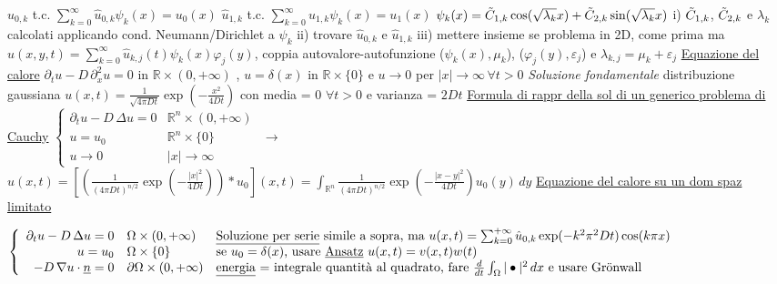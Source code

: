 \documentclass{article}
\begin{document}
\quad $\hat{u}_{0,k}$ t.c. $\sum_{k=0}^\infty \hat{u}_{0,k}\psi_k(x)=u_0(x)$
\quad $\hat{u}_{1,k}$ t.c. $\sum_{k=0}^\infty \hat{u}_{1,k}\psi_k(x)=u_1(x)$
\quad $\psi_k(x)=\Tilde{C}_{1,k}\cos (\sqrt{\lambda_k}x)+\Tilde{C}_{2,k}\sin (\sqrt{\lambda_k}x)$
\quad i) $\Tilde{C}_{1,k}$, $\Tilde{C}_{2,k}$ e $\lambda_k$ calcolati applicando cond. Neumann/Dirichlet a $\psi_k$ 
ii) trovare $\hat{u}_{0,k}$ e $\hat{u}_{1,k}$ iii) mettere insieme
\quad se problema in 2D, come prima ma $u(x,y,t)=\sum_{k=0}^\infty \hat{u}_{k,j}(t)\psi_k(x)\varphi_j(y)$, coppia autovalore-autofunzione ($\psi_k(x),\mu_k$), ($\varphi_j(y),\varepsilon_j$) e $\lambda_{k,j}=\mu_k+\varepsilon_j$
\underline{Equazione del calore}
$\partial_tu-D\,\partial_x^2u=0$ in $\mathbb{R}\times (0,+\infty)$ , $u = \delta(x)$ in $\mathbb{R}\times \{ 0 \}$ e $u \rightarrow 0$ per $|x| \rightarrow \infty \, \forall t>0$
\textit{Soluzione fondamentale} distribuzione gaussiana $u(x,t)=\frac{1}{\sqrt{4 \pi Dt}}\exp{(-\frac{x^2}{4Dt})}$ con media = 0 $\forall t>0$ e varianza = $2Dt$
\underline{Formula di rappr della sol di un generico problema di Cauchy}
$\left\{ \begin{array}{rl}
\partial_tu-D\,\Delta u=0 & \mathbb{R}^n \times (0,+\infty) \\
u=u_0 & \mathbb{R}^n \times \{ 0 \} \\
u \rightarrow 0 & |x|\rightarrow \infty
\end{array}\right.$ $\rightarrow$
$u(x,t) = [(\frac{1}{(4\pi Dt)^{n/2}}\exp{(-\frac{|x|^2}{4Dt})})\ast u_0](x,t) = \int_{\mathbb{R}^n}\frac{1}{(4\pi Dt)^{n/2}}\exp{(-\frac{|x-y|^2}{4Dt})}u_0(y)\,dy $
\underline{Equazione del calore su un dom spaz limitato}

$\left\{ \begin{array}{rll}
\partial_tu-D\, \Delta u =0 & \Omega \times (0,+\infty) & \text{\underline{Soluzione per serie} simile a sopra, ma $u(x,t)=\sum_{k=0}^{+\infty}\hat{u}_{0,k}\exp(-k^2\pi^2Dt)\cos(k\pi x)$}\\
u=u_0 & \Omega \times \{0\} & \text{se $u_0 = \delta(x)$, usare \underline{Ansatz} $u(x,t)=v(x,t)w(t)$}\\
-D\,\nabla u\cdot\underline{n}=0 & \partial\Omega\times(0,+\infty) & \text{\underline{energia} = integrale quantità al quadrato, fare $\frac{d}{dt}\int_\Omega |\bullet|^2 \,dx$ e usare Grönwall}
\end{array} \right.$
\end{document}
